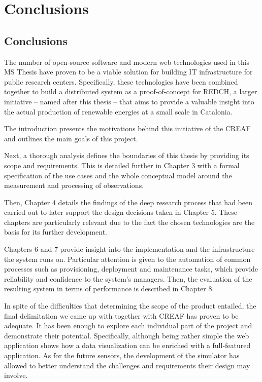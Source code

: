 \chapter{Conclusions}

\section{Conclusions}

The number of open-source software and modern web technologies used in this MS Thesis have proven to be a viable solution for building IT infrastructure for public research centers. Specifically, these technologies have been combined together to build a distributed system as a proof-of-concept for REDCH, a larger initiative -- named after this thesis -- that aims to provide a valuable insight into the actual production of renewable energies at a small scale in Catalonia.

The introduction presents the motivations behind this initiative of the CREAF and outlines the main goals of this project.

Next, a thorough analysis defines the boundaries of this thesis by providing its scope and requirements. This is detailed further in Chapter 3 with a formal specification of the use cases and the whole conceptual model around the measurement and processing of observations.

Then, Chapter 4 details the findings of the deep research process that had been carried out 
to later support the design decisions taken in Chapter 5. These chapters are particularly relevant due to the fact the chosen technologies are the basis for its further development.

Chapters 6 and 7 provide insight into the implementation and the infrastructure the system runs on. Particular attention is given to the automation of common processes such as provisioning, deployment and maintenance tasks, which provide reliability and confidence to the system's managers. Then, the evaluation of the resulting system in terms of performance is described in Chapter 8.

In spite of the difficulties that determining the scope of the product entailed, the final delimitation we came up with together with CREAF has proven to be adequate. It has been enough to explore each individual part of the project and demonstrate their potential. Specifically, although being rather simple the web application shows how a data visualization can be enriched with a full-featured application. As for the future sensors, the development of the simulator has allowed to better understand the challenges and requirements their design may involve.

